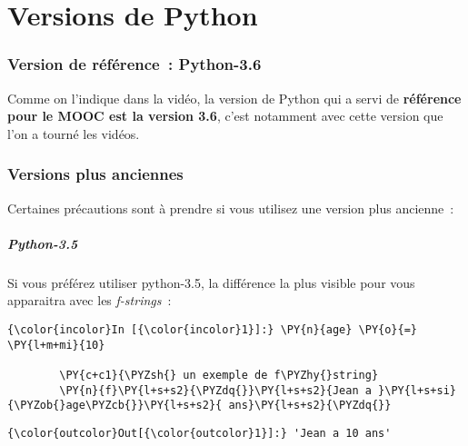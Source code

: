     
    
    
    

    

    \hypertarget{versions-de-python}{%
\section{Versions de Python}\label{versions-de-python}}

    \hypertarget{version-de-ruxe9fuxe9rence-python-3.6}{%
\subsubsection{Version de référence~:
Python-3.6}\label{version-de-ruxe9fuxe9rence-python-3.6}}

    Comme on l'indique dans la vidéo, la version de Python qui a servi de
\textbf{référence pour le MOOC est la version 3.6}, c'est notamment avec
cette version que l'on a tourné les vidéos.

    \hypertarget{versions-plus-anciennes}{%
\subsubsection{Versions plus anciennes}\label{versions-plus-anciennes}}

    Certaines précautions sont à prendre si vous utilisez une version plus
ancienne~:

    \hypertarget{python-3.5}{%
\subparagraph{Python-3.5}\label{python-3.5}}

    Si vous préférez utiliser python-3.5, la différence la plus visible pour
vous apparaitra avec les \emph{f-strings}~:

    \begin{Verbatim}[commandchars=\\\{\},frame=single,framerule=0.3mm,rulecolor=\color{cellframecolor}]
{\color{incolor}In [{\color{incolor}1}]:} \PY{n}{age} \PY{o}{=} \PY{l+m+mi}{10}
        
        \PY{c+c1}{\PYZsh{} un exemple de f\PYZhy{}string}
        \PY{n}{f}\PY{l+s+s2}{\PYZdq{}}\PY{l+s+s2}{Jean a }\PY{l+s+si}{\PYZob{}age\PYZcb{}}\PY{l+s+s2}{ ans}\PY{l+s+s2}{\PYZdq{}}
\end{Verbatim}


\begin{Verbatim}[commandchars=\\\{\},frame=single,framerule=0.3mm,rulecolor=\color{cellframecolor}]
{\color{outcolor}Out[{\color{outcolor}1}]:} 'Jean a 10 ans'
\end{Verbatim}
            
